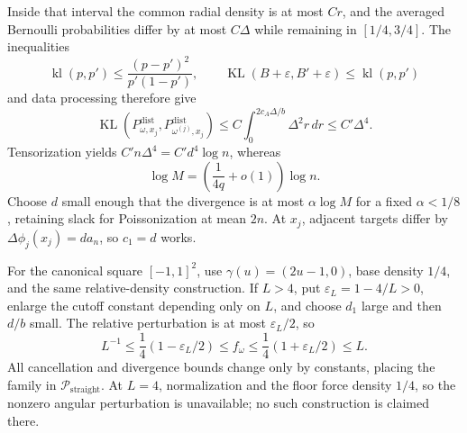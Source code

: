 Inside that interval the common radial density is at most \(Cr\), and the averaged Bernoulli probabilities differ by at most \(C\Delta\) while remaining in \([1/4,3/4]\).  The inequalities
\[
 \operatorname{kl}(p,p')\leq\frac{(p-p')^2}{p'(1-p')},
 \qquad
 \operatorname{KL}(B+\varepsilon,B'+\varepsilon)
 \leq\operatorname{kl}(p,p')
\]
and data processing therefore give
\[
 \operatorname{KL}(P^{\mathrm{dist}}_{\omega,x_j},
 P^{\mathrm{dist}}_{\omega^{(j)},x_j})
 \leq C\int_0^{2c_A\Delta/b}\Delta^2r\,dr
 \leq C'\Delta^4.
\]
Tensorization yields \(C'n\Delta^4=C'd^4\log n\), whereas
\[
 \log M=\left(\frac1{4q}+o(1)\right)\log n.
\]
Choose \(d\) small enough that the divergence is at most \(\alpha\log M\) for a fixed \(\alpha<1/8\), retaining slack for Poissonization at mean \(2n\).  At \(x_j\), adjacent targets differ by \(\Delta\phi_j(x_j)=da_n\), so \(c_1=d\) works.

For the canonical square \([-1,1]^2\), use \(\gamma(u)=(2u-1,0)\), base density \(1/4\), and the same relative-density construction.  If \(L>4\), put \(\varepsilon_L=1-4/L>0\), enlarge the cutoff constant depending only on \(L\), and choose \(d_1\) large and then \(d/b\) small.  The relative perturbation is at most \(\varepsilon_L/2\), so
\[
 L^{-1}\leq\frac14(1-\varepsilon_L/2)
 \leq f_\omega\leq\frac14(1+\varepsilon_L/2)\leq L.
\]
All cancellation and divergence bounds change only by constants, placing the family in \(\mathcal P_{\mathrm{straight}}\).  At \(L=4\), normalization and the floor force density \(1/4\), so the nonzero angular perturbation is unavailable; no such construction is claimed there.